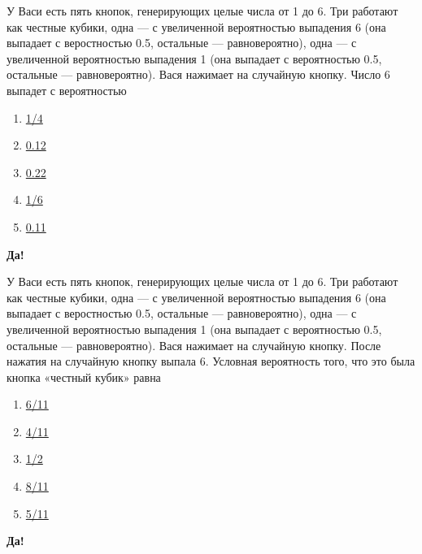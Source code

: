 \documentclass[t]{beamer}
\begin{document}
 \begin{frame} \label{14-Yes} 
\begin{block}{14} 

У Васи есть пять кнопок, генерирующих целые числа от 1 до 6. Три работают как честные кубики, одна — с увеличенной вероятностью выпадения 6 (она выпадает с веростностью 0.5, остальные — равновероятно), одна — с увеличенной вероятностью выпадения 1 (она выпадает с вероятностью 0.5, остальные — равновероятно). Вася нажимает на случайную кнопку. Число 6 выпадет с вероятностью
  


 \end{block} 
\begin{enumerate} 
\item[] \hyperlink{14-No}{\beamergotobutton{}  1/4 }
\item[] \hyperlink{14-No}{\beamergotobutton{}  0.12 }
\item[] \hyperlink{14-Yes}{\beamergotobutton{}  0.22 }
\item[] \hyperlink{14-No}{\beamergotobutton{}  1/6 }
\item[] \hyperlink{14-No}{\beamergotobutton{}  0.11 }
\end{enumerate} 

 \textbf{Да!} 
 \hyperlink{15}{}\end{frame} 


 \begin{frame} \label{15-Yes} 
\begin{block}{15} 

У Васи есть пять кнопок, генерирующих целые числа от 1 до 6. Три работают как честные кубики, одна — с увеличенной вероятностью выпадения 6 (она выпадает с веростностью 0.5, остальные — равновероятно), одна — с увеличенной вероятностью выпадения 1 (она выпадает с вероятностью 0.5, остальные — равновероятно). Вася нажимает на случайную кнопку. После нажатия на случайную кнопку выпала 6. Условная вероятность того, что это была кнопка «честный кубик» равна


 \end{block} 
\begin{enumerate} 
\item[] \hyperlink{15-No}{\beamergotobutton{}  6/11 }
\item[] \hyperlink{15-No}{\beamergotobutton{}  4/11 }
\item[] \hyperlink{15-No}{\beamergotobutton{}  1/2 }
\item[] \hyperlink{15-No}{\beamergotobutton{}  8/11 }
\item[] \hyperlink{15-Yes}{\beamergotobutton{}  5/11 }
\end{enumerate} 

 \textbf{Да!} 
 \hyperlink{16}{}\end{frame} 
\end{document}
